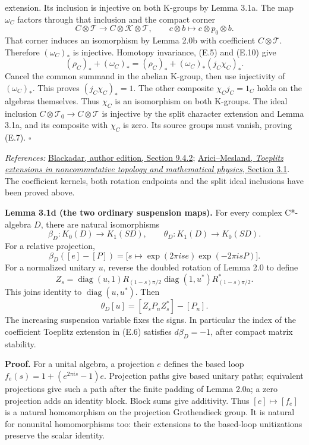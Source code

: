 \documentclass[
  11pt,
]{article}
\begin{document}
extension. Its inclusion is injective on both K-groups by Lemma 3.1a.
The map \(\omega_C\) factors through that inclusion and the compact
corner \[
C\otimes\mathcal T\longrightarrow C\otimes\mathcal K\otimes\mathcal T,\qquad
c\otimes b\longmapsto c\otimes p_0\otimes b.
\] That corner induces an isomorphism by Lemma 2.0b with coefficient
\(C\otimes\mathcal T\). Therefore \((\omega_C)_*\) is injective.
Homotopy invariance, (E.5) and (E.10) give \[
(\rho_C)_*+(\omega_C)_*
=(\rho_C)_*+(\omega_C)_*(j_C\chi_C)_*.
\] Cancel the common summand in the abelian K-group, then use
injectivity of \((\omega_C)_*\). This proves \((j_C\chi_C)_*=1\). The
other composite \(\chi_Cj_C=1_C\) holds on the algebras themselves. Thus
\(\chi_C\) is an isomorphism on both K-groups. The ideal inclusion
\(C\otimes\mathcal T_0\to C\otimes\mathcal T\) is injective by the split
character extension and Lemma 3.1a, and its composite with \(\chi_C\) is
zero. Its source groups must vanish, proving (E.7). \(\square\)

\emph{References:}
\href{https://www.bruceblackadar.com/Mathematics/book6.pdf}{Blackadar,
author edition, Section 9.4.2};
\href{https://arxiv.org/pdf/1911.05823v1}{Arici--Mesland, \emph{Toeplitz
extensions in noncommutative topology and mathematical physics}, Section
3.1}. The coefficient kernels, both rotation endpoints and the split
ideal inclusions have been proved above.

\textbf{Lemma 3.1d (the two ordinary suspension maps).} For every
complex C*-algebra \(D\), there are natural isomorphisms \[
\beta_D:K_0(D)\longrightarrow K_1(SD),\qquad
\theta_D:K_1(D)\longrightarrow K_0(SD).
\tag{E.11}
\] For a relative projection, \[
\beta_D([e]-[P])=
\bigl[s\longmapsto\exp(2\pi i s e)\exp(-2\pi i sP)\bigr].
\tag{E.12}
\] For a normalized unitary \(u\), reverse the doubled rotation of Lemma
2.0 to define \[
Z_s=\operatorname{diag}(u,1)R_{(1-s)\pi/2}
\operatorname{diag}(1,u^*)R_{(1-s)\pi/2}^*.
\] This joins identity to \(\operatorname{diag}(u,u^*)\). Then \[
\theta_D[u]=[Z_sP_nZ_s^*]-[P_n].
\tag{E.13}
\] The increasing suspension variable fixes the signs. In particular the
index of the coefficient Toeplitz extension in (E.6) satisfies
\(d\beta_D=-1\), after compact matrix stability.

\textbf{Proof.} For a unital algebra, a projection \(e\) defines the
based loop \(f_e(s)=1+(e^{2\pi i s}-1)e\). Projection paths give based
unitary paths; equivalent projections give such a path after the finite
padding of Lemma 2.0a; a zero projection adds an identity block. Block
sums give additivity. Thus \([e]\mapsto[f_e]\) is a natural homomorphism
on the projection Grothendieck group. It is natural for nonunital
homomorphisms too: their extensions to the based-loop unitizations
preserve the scalar identity.
\end{document}
